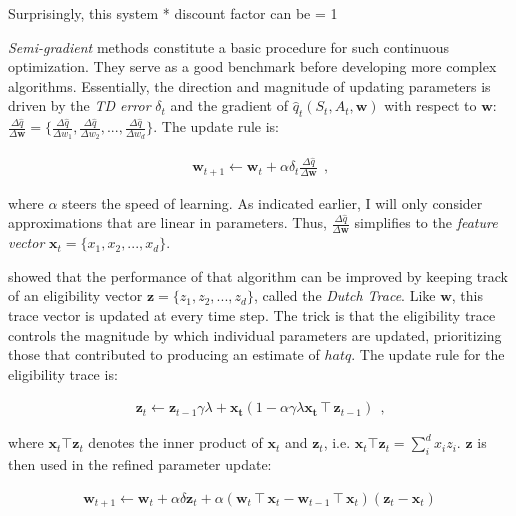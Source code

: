 Surprisingly, this system 
* discount factor can be = 1






\emph{Semi-gradient} methods constitute a basic procedure for such continuous optimization. They serve as a good benchmark before developing more complex algorithms. Essentially, the direction and magnitude of updating parameters is driven by the \emph{TD error} $\delta_t$ and the gradient of $\hat{q}_t(S_t, A_t, \boldsymbol{w})$ with respect to $\boldsymbol{w}$:
$\frac{\Delta \hat{q}}{\Delta \boldsymbol{w}} =
\{ \frac{\Delta \hat{q}}{\Delta w_1},
\frac{\Delta \hat{q}}{\Delta w_2},
...,
\frac{\Delta \hat{q}}{\Delta w_d}  \}$. The update rule is:

\begin{gather}
 \boldsymbol{w}_{t+1} \leftarrow \boldsymbol{w}_t +
 	\alpha \delta_t
 	\frac{\Delta \hat{q}}{\Delta \boldsymbol{w}} ~~ \text{,}
\end{gather}

where $\alpha$ steers the speed of learning. As indicated earlier, I will only consider approximations that are linear in parameters. Thus, $\frac{\Delta \hat{q}}{\Delta \boldsymbol{w}}$ simplifies to the \emph{feature vector} $\boldsymbol{x}_t = \{x_1, x_2, ..., x_d\}$.

\textcite{seijen_true_2014} showed that the performance of that algorithm can be improved by keeping track of an eligibility vector $\boldsymbol{z} = \{z_1, z_2, ..., z_d\}$, called the \emph{Dutch Trace}. Like $\boldsymbol{w}$, this trace vector is updated at every time step. The trick is that the eligibility trace controls the magnitude by which individual parameters are updated, prioritizing those that contributed to producing an estimate of $hat{q}$. The update rule for the eligibility trace is:

\begin{gather}
\boldsymbol{z}_{t} \leftarrow \boldsymbol{z}_{t-1} \gamma \lambda + \boldsymbol{x_t} (1 - \alpha \gamma \lambda  {  \boldsymbol{x_t} \intercal \boldsymbol{z}_{t-1} }) ~~ \text{,}
\end{gather}

where $ \boldsymbol{x}_t \top \boldsymbol{z}_t $ denotes the inner product of $\boldsymbol{x}_t$ and $\boldsymbol{z}_t$, i.e. $ \boldsymbol{x}_t \top \boldsymbol{z}_t  = \sum_{i}^{d} x_i z_i$. $\boldsymbol{z}$ is then used in the refined parameter update:

\begin{gather}
	\boldsymbol{w}_{t+1} \leftarrow
		\boldsymbol{w}_{t} +
		\alpha \delta \boldsymbol{z}_t +
		\alpha ( \boldsymbol{w}_t \intercal \boldsymbol{x}_t  -
				 \boldsymbol{w}_{t-1} \intercal \boldsymbol{x}_t)
				(\boldsymbol{z}_t - \boldsymbol{x}_t)
\end{gather}




